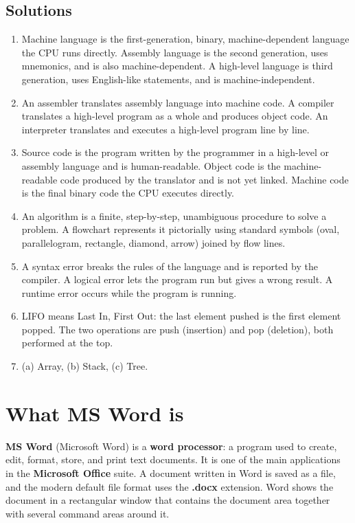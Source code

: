 \subsection*{Solutions}
\begingroup\small
\begin{enumerate}[label=\arabic*.]
  \item Machine language is the first-generation, binary, machine-dependent
    language the CPU runs directly. Assembly language is the second
    generation, uses mnemonics, and is also machine-dependent. A high-level
    language is third generation, uses English-like statements, and is
    machine-independent.
  \item An assembler translates assembly language into machine code. A
    compiler translates a high-level program as a whole and produces object
    code. An interpreter translates and executes a high-level program line by
    line.
  \item Source code is the program written by the programmer in a high-level
    or assembly language and is human-readable. Object code is the
    machine-readable code produced by the translator and is not yet linked.
    Machine code is the final binary code the CPU executes directly.
  \item An algorithm is a finite, step-by-step, unambiguous procedure to solve
    a problem. A flowchart represents it pictorially using standard symbols
    (oval, parallelogram, rectangle, diamond, arrow) joined by flow lines.
  \item A syntax error breaks the rules of the language and is reported by
    the compiler. A logical error lets the program run but gives a wrong
    result. A runtime error occurs while the program is running.
  \item LIFO means Last In, First Out: the last element pushed is the first
    element popped. The two operations are push (insertion) and pop
    (deletion), both performed at the top.
  \item (a) Array, (b) Stack, (c) Tree.
\end{enumerate}
\endgroup

\section{What MS Word is}
\textbf{MS Word} (Microsoft Word) is a \textbf{word processor}: a program
used to create, edit, format, store, and print text documents. It is one of
the main applications in the \textbf{Microsoft Office} suite. A document
written in Word is saved as a file, and the modern default file format uses
the \textbf{.docx} extension. Word shows the document in a rectangular
window that contains the document area together with several command areas
around it.

